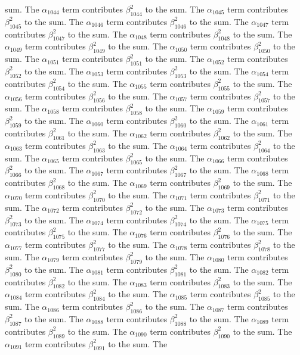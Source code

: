 \begin{lemma}
sum. The $\alpha_{1044}$ term contributes $\beta_{1044}^{2}$ to the sum. The $\alpha_{1045}$ term contributes $\beta_{1045}^{2}$ to the sum. The $\alpha_{1046}$ term contributes $\beta_{1046}^{2}$ to the sum. The $\alpha_{1047}$ term contributes $\beta_{1047}^{2}$ to the sum. The $\alpha_{1048}$ term contributes $\beta_{1048}^{2}$ to the sum. The $\alpha_{1049}$ term contributes $\beta_{1049}^{2}$ to the sum. The $\alpha_{1050}$ term contributes $\beta_{1050}^{2}$ to the sum. The $\alpha_{1051}$ term contributes $\beta_{1051}^{2}$ to the sum. The $\alpha_{1052}$ term contributes $\beta_{1052}^{2}$ to the sum. The $\alpha_{1053}$ term contributes $\beta_{1053}^{2}$ to the sum. The $\alpha_{1054}$ term contributes $\beta_{1054}^{2}$ to the sum. The $\alpha_{1055}$ term contributes $\beta_{1055}^{2}$ to the sum. The $\alpha_{1056}$ term contributes $\beta_{1056}^{2}$ to the sum. The $\alpha_{1057}$ term contributes $\beta_{1057}^{2}$ to the sum. The $\alpha_{1058}$ term contributes $\beta_{1058}^{2}$ to the sum. The $\alpha_{1059}$ term contributes $\beta_{1059}^{2}$ to the sum. The $\alpha_{1060}$ term contributes $\beta_{1060}^{2}$ to the sum. The $\alpha_{1061}$ term contributes $\beta_{1061}^{2}$ to the sum. The $\alpha_{1062}$ term contributes $\beta_{1062}^{2}$ to the sum. The $\alpha_{1063}$ term contributes $\beta_{1063}^{2}$ to the sum. The $\alpha_{1064}$ term contributes $\beta_{1064}^{2}$ to the sum. The $\alpha_{1065}$ term contributes $\beta_{1065}^{2}$ to the sum. The $\alpha_{1066}$ term contributes $\beta_{1066}^{2}$ to the sum. The $\alpha_{1067}$ term contributes $\beta_{1067}^{2}$ to the sum. The $\alpha_{1068}$ term contributes $\beta_{1068}^{2}$ to the sum. The $\alpha_{1069}$ term contributes $\beta_{1069}^{2}$ to the sum. The $\alpha_{1070}$ term contributes $\beta_{1070}^{2}$ to the sum. The $\alpha_{1071}$ term contributes $\beta_{1071}^{2}$ to the sum. The $\alpha_{1072}$ term contributes $\beta_{1072}^{2}$ to the sum. The $\alpha_{1073}$ term contributes $\beta_{1073}^{2}$ to the sum. The $\alpha_{1074}$ term contributes $\beta_{1074}^{2}$ to the sum. The $\alpha_{1075}$ term contributes $\beta_{1075}^{2}$ to the sum. The $\alpha_{1076}$ term contributes $\beta_{1076}^{2}$ to the sum. The $\alpha_{1077}$ term contributes $\beta_{1077}^{2}$ to the sum. The $\alpha_{1078}$ term contributes $\beta_{1078}^{2}$ to the sum. The $\alpha_{1079}$ term contributes $\beta_{1079}^{2}$ to the sum. The $\alpha_{1080}$ term contributes $\beta_{1080}^{2}$ to the sum. The $\alpha_{1081}$ term contributes $\beta_{1081}^{2}$ to the sum. The $\alpha_{1082}$ term contributes $\beta_{1082}^{2}$ to the sum. The $\alpha_{1083}$ term contributes $\beta_{1083}^{2}$ to the sum. The $\alpha_{1084}$ term contributes $\beta_{1084}^{2}$ to the sum. The $\alpha_{1085}$ term contributes $\beta_{1085}^{2}$ to the sum. The $\alpha_{1086}$ term contributes $\beta_{1086}^{2}$ to the sum. The $\alpha_{1087}$ term contributes $\beta_{1087}^{2}$ to the sum. The $\alpha_{1088}$ term contributes $\beta_{1088}^{2}$ to the sum. The $\alpha_{1089}$ term contributes $\beta_{1089}^{2}$ to the sum. The $\alpha_{1090}$ term contributes $\beta_{1090}^{2}$ to the sum. The $\alpha_{1091}$ term contributes $\beta_{1091}^{2}$ to the sum. The 
\end{lemma}
